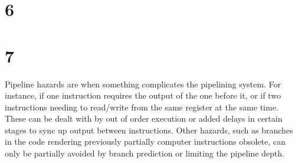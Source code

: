 \documentclass[letterpaper,10pt,titlepage]{article}
\begin{document}
\section{6}

\section{7}
Pipeline hazards are when something complicates the pipelining system. For instance, if one instruction
requires the output of the one before it, or if two instructions needing to read/write from the same
register at the same time. These can be dealt with by out of order execution or added delays in certain
stages to sync up output between instructions. Other hazards, such as branches in the code rendering
previously partially computer instructions obsolete, can only be partially avoided by branch prediction
or limiting the pipeline depth. 
\end{document}
